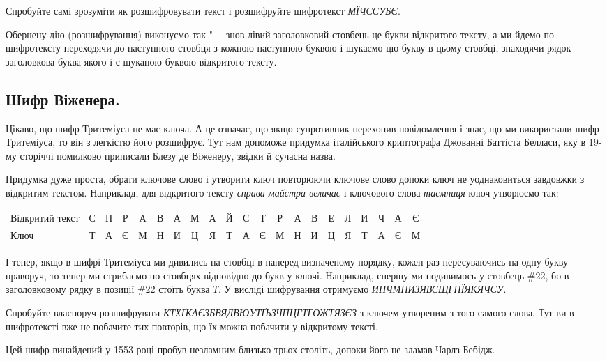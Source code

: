 \documentclass{book}
\begin{document}
{Спробуйте самі зрозуміти як розшифровувати текст і розшифруйте шифротекст
\emph{МЇЧССУБЄ}.

Обернену дію (розшифрування) виконуємо так "--- знов лівий заголовковий стовбець
це букви відкритого тексту, а ми йдемо по шифротексту переходячи до наступного
стовбця з кожною наступною буквою і шукаємо цю букву в цьому стовбці, знаходячи
рядок заголовкова буква якого і є шуканою буквою відкритого тексту.

\subsection*{Шифр Віженера.}

Цікаво, що шифр Тритеміуса не має ключа. А це означає, що якщо супротивник перехопив
повідомлення і знає, що ми використали шифр Тритеміуса, то він з легкістю його
розшифрує. Тут нам допоможе придумка італійського криптографа Джованні Баттіста
Белласи, яку в 19-му сторіччі помилково приписали Блезу де Віженеру, звідки й
сучасна назва.

Придумка дуже проста, обрати ключове слово і утворити ключ повторюючи
ключове слово допоки ключ не уоднаковиться завдовжки з відкритим
текстом. Наприклад, для відкритого тексту \emph{справа майстра величає} і
ключового слова \emph{таємниця} ключ утворюємо так:

\noindent
	\setlength\tabcolsep{0.5pt}
	\begin{tabular}{ lcccccccccccccccccccc }
		Відкритий текст&С&П&Р&А&В&А&М&А&Й&С&Т&Р&А&В&Е&Л&И&Ч&А&Є \\
		Ключ&Т&А&Є&М&Н&И&Ц&Я&Т&А&Є&М&Н&И&Ц&Я&Т&А&Є&М \\
	\end{tabular}
	\setlength\tabcolsep{6pt}

І тепер, якщо в шифрі Тритеміуса ми дивились на стовбці в наперед визначеному
порядку, кожен раз пересуваючись на одну букву праворуч, то тепер ми стрибаємо
по стовбцях відповідно до букв у ключі. Наприклад, спершу ми подивимось у
стовбець \#22, бо в заголовковому рядку в позиції \#22 стоїть буква \emph{Т}.
У висліді шифрування отримуємо \emph{ИПЧМПИЗЯВСЩГНЇЯКЯЧЄУ}.

Спробуйте власноруч розшифрувати \emph{КТХҐКАЄЗБВЯДВЮУТҐЬЗЧПЦГТГОЖТЯЗЄЗ} з
ключем утвореним з того самого слова. Тут ви в шифротексті вже не побачите
тих повторів, що їх можна побачити у відкритому тексті.

Цей шифр винайдений у 1553 році пробув незламним близько трьох століть, допоки
його не зламав Чарлз Бебідж.

}
\end{document}
